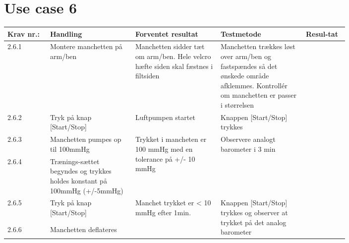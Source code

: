 \section{Use case 6}
						\begin{longtable}{|p{0.1\linewidth}|p{0.2\linewidth}|p{0.2\linewidth}|p{0.2\linewidth}|p{0.1\linewidth}|}
								\hline
								Krav nr.: & Handling & Forventet resultat & Testmetode & Resul-tat  \\\hline
								2.6.1 & Montere manchetten på arm/ben & Manchetten sidder tæt om arm/ben. Hele velcro hæfte siden skal fæstnes i filtsiden & Manchetten trækkes løst over arm/ben og fastspændes så det ønskede område afklemmes. Kontrollér om manchetten er passer i størrelsen & \\ \hline
								2.6.2 & Tryk på knap [Start/Stop] & Luftpumpen startet & Knappen [Start/Stop] trykkes & \\ \hline
								2.6.3 & Manchetten pumpes op til 100mmHg & \multirow{2}{\linewidth}{Trykket i mancheten er 100 mmHg med en tolerance på +/- 10 mmHg}& \multirow{2}{\linewidth}{Observere analogt barometer i 3 min}& \multirow{2}{\linewidth}{} \\ \cline{1-2}
								2.6.4 & Trænings-sættet begyndes og trykkes holdes konstant på 100mmHg (+/-5mmHg) & & & \\ \hline
								2.6.5 & Tryk på knap [Start/Stop]  & \multirow{2}{\linewidth}{Manchet trykket er < 10 mmHg efter 1min.} & \multirow{2}{\linewidth}{Knappen [Start/Stop] trykkes og observer at trykket på det analog barometer} & \multirow{2}{\linewidth}{} \\ [2cm] \cline{1-2}
								2.6.6 & Manchetten deflateres  & & & \\ \hline
						\end{longtable}